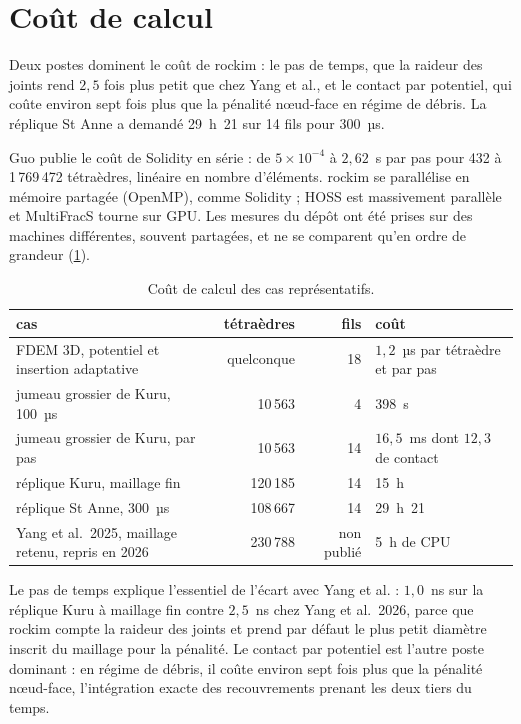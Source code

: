 \section{Coût de calcul}
\label{sec-cout}

Deux postes dominent le coût de rockim : le pas de temps, que la raideur des joints rend $2{,}5$ fois plus petit que chez Yang et al., et le contact par potentiel, qui coûte environ sept fois plus que la pénalité nœud-face en régime de débris. La réplique St Anne a demandé 29~h~21 sur 14 fils pour 300~µs.

Guo publie le coût de Solidity en série : de $5\times10^{-4}$ à $2{,}62$~s par pas pour 432 à 1\,769\,472 tétraèdres, linéaire en nombre d'éléments. rockim se parallélise en mémoire partagée (OpenMP), comme Solidity ; HOSS est massivement parallèle et MultiFracS tourne sur GPU. Les mesures du dépôt ont été prises sur des machines différentes, souvent partagées, et ne se comparent qu'en ordre de grandeur (\cref{tab-cout}).

\begin{table}[htbp]
\centering
\caption{Coût de calcul des cas représentatifs.}
\label{tab-cout}
\small
\begin{tabularx}{\linewidth}{@{}X r r l@{}}
\toprule
cas & tétraèdres & fils & coût \\
\midrule
FDEM 3D, potentiel et insertion adaptative & quelconque & 18 & $1{,}2$~µs par tétraèdre et par pas \\
jumeau grossier de Kuru, 100~µs & 10\,563 & 4 & 398~s \\
jumeau grossier de Kuru, par pas & 10\,563 & 14 & $16{,}5$~ms dont $12{,}3$ de contact \\
réplique Kuru, maillage fin & 120\,185 & 14 & 15~h \\
réplique St Anne, 300~µs & 108\,667 & 14 & 29~h~21 \\
Yang et al.~2025, maillage retenu, repris en 2026 & 230\,788 & non publié & 5~h de CPU \\
\bottomrule
\end{tabularx}
\end{table}

Le pas de temps explique l'essentiel de l'écart avec Yang et al. : $1{,}0$~ns sur la réplique Kuru à maillage fin contre $2{,}5$~ns chez Yang et al.~2026, parce que rockim compte la raideur des joints et prend par défaut le plus petit diamètre inscrit du maillage pour la pénalité. Le contact par potentiel est l'autre poste dominant : en régime de débris, il coûte environ sept fois plus que la pénalité nœud-face, l'intégration exacte des recouvrements prenant les deux tiers du temps.

